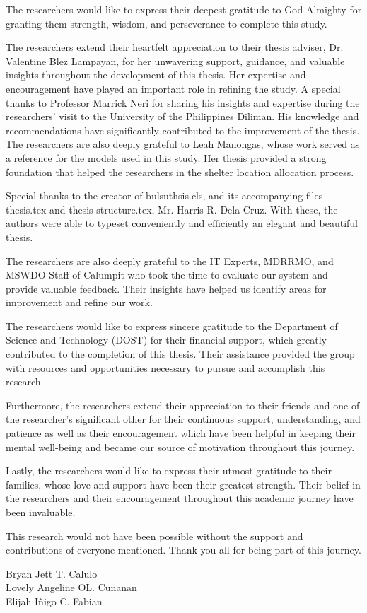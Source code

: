\begin{acknowledgment}
	The researchers would like to express their deepest gratitude to God Almighty for granting them strength, wisdom, and perseverance to complete this study.
	
	The researchers extend their heartfelt appreciation to their thesis adviser, Dr. Valentine Blez Lampayan, for her unwavering support, guidance, and valuable insights throughout the development of this thesis. Her expertise and encouragement have played an important role in refining the study. A special thanks to Professor Marrick Neri for sharing his insights and expertise during the researchers’ visit to the University of the Philippines Diliman. His knowledge and recommendations have significantly contributed to the improvement of the thesis. The researchers are also deeply grateful to Leah Manongas, whose work served as a reference for the models used in this study. Her thesis provided a strong foundation that helped the researchers in the shelter location allocation process. 
	
	Special thanks to the creator of bulsuthsis.cls, and its accompanying files thesis.tex and thesis-structure.tex, Mr. Harris R. Dela Cruz. With these, the authors were able to typeset conveniently and efficiently an elegant and beautiful thesis.
	
	The researchers are also deeply grateful to the IT Experts, MDRRMO, and MSWDO Staff of Calumpit who took the time to evaluate our system and provide valuable feedback. Their insights have helped us identify areas for improvement and refine our work. 
	
	The researchers would like to express sincere gratitude to the Department of Science and Technology (DOST) for their financial support, which greatly contributed to the completion of this thesis. Their assistance provided the group with resources and opportunities necessary to pursue and accomplish this research.
	
	Furthermore, the researchers extend their appreciation to their friends and one of the researcher’s significant other for their continuous support, understanding, and patience as well as their encouragement which have been helpful in keeping their mental well-being and became our source of motivation throughout this journey.
	
	Lastly, the researchers would like to express their utmost gratitude to their families, whose love and support have been their greatest strength. Their belief in the researchers and their encouragement throughout this academic journey have been invaluable.
	
	This research would not have been possible without the support and contributions of everyone mentioned. Thank you all for being part of this journey.
	
	\begin{flushright}
	Bryan Jett T. Calulo\\
	Lovely Angeline OL. Cunanan\\
	Elijah Iñigo C. Fabian\\
	\end{flushright}

\end{acknowledgment}
